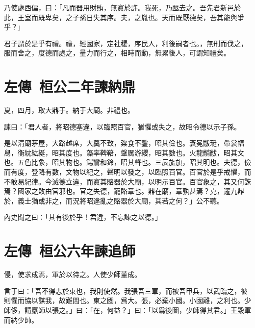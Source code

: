 乃使處西偏，曰：「凡而器用財賄，無寘於許。我死，乃亟去之。吾先君新邑於此，王室而既卑矣，之子孫日失其序。夫，之胤也。天而既厭德矣，吾其能與爭乎？」

君子謂於是乎有禮。禮，經國家，定社稷，序民人，利後嗣者也。，無刑而伐之，服而舍之，度德而處之，量力而行之，相時而動，無累後人，可謂知禮矣。

\theendnotes

\section[臧哀伯諫納郜鼎\quad{\small 左傳\ 桓公二年}]{{\normalsize 左傳\ 桓公二年}\quad {}諫納鼎}
夏，四月，取大鼎于。納于大廟。非禮也。

諫曰：「君人者，將昭德塞違，以臨照百官，猶懼或失之，故昭令德以示子孫。

是以清廟茅屋，大路越席，大羹不致，粢食不鑿，昭其儉也。袞冕黻珽，帶裳幅舄，衡紞紘綖，昭其度也。藻率鞞鞛，鞶厲游纓，昭其數也。火龍黼黻，昭其文也。五色比象，昭其物也。鍚鸞和鈴，昭其聲也。三辰旂旗，昭其明也。夫德，儉而有度，登降有數，文物以紀之，聲明以發之，以臨照百官。百官於是乎戒懼，而不敢易紀律。今滅德立違，而寘其賂器於大廟，以明示百官。百官象之，其又何誅焉？國家之敗由官邪也。官之失德，寵賂章也。鼎在廟，章孰甚焉？克，遷九鼎於，義士猶或非之，而況將昭違亂之賂器於大廟，其若之何？」公不聽。

內史聞之曰：「其有後於乎！君違，不忘諫之以德。」

\theendnotes

\section[季梁諫追楚師\quad{\small 左傳\ 桓公六年}]{{\normalsize 左傳\ 桓公六年}\quad {}諫追師}
侵，使求成焉，軍於以待之。人使少師董成。

言于曰：「吾不得志於東也，我則使然。我張吾三軍，而被吾甲兵，以武臨之，彼則懼而協以謀我，故難間也。東之國，爲大。張，必棄小國。小國離，之利也。少師侈，請羸師以張之。」曰：「在，何益？」曰：「以爲後圖，少師得其君。」王毀軍而納少師。

